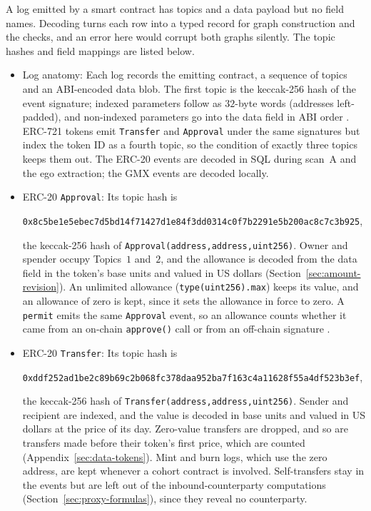 A log emitted by a smart contract has topics and a data payload but no field names. Decoding turns each row into a typed record for graph construction and the checks, and an error here would corrupt both graphs silently. The topic hashes and field mappings are listed below.

\begin{itemize}
\item Log anatomy: Each log records the emitting contract, a sequence of topics and an ABI-encoded data blob. The first topic is the keccak-256 hash of the event signature; indexed parameters follow as $32$-byte words (addresses left-padded), and non-indexed parameters go into the data field in ABI order \parencite{vogelsteller2015erc20}. ERC-721 tokens emit \texttt{Transfer} and \texttt{Approval} under the same signatures but index the token ID as a fourth topic, so the condition of exactly three topics keeps them out. The ERC-20 events are decoded in SQL during scan~A and the ego extraction; the GMX events are decoded locally.

\item ERC-20 \texttt{Approval}: Its topic hash is
\begin{center}
\texttt{0x8c5be1e5ebec7d5bd14f71427d1e84f3dd0314c0f7b2291e5b200ac8c7c3b925},
\end{center}
the keccak-256 hash of \texttt{Approval(address,address,uint256)}. Owner and spender occupy Topics~$1$ and~$2$, and the allowance is decoded from the data field in the token's base units and valued in US dollars (Section~\ref{sec:amount-revision}). An unlimited allowance (\texttt{type(uint256).max}) keeps its value, and an allowance of zero is kept, since it sets the allowance in force to zero. A \texttt{permit} emits the same \texttt{Approval} event, so an allowance counts whether it came from an on-chain \texttt{approve()} call or from an off-chain signature \parencite{lundfall2020permit}.

\item ERC-20 \texttt{Transfer}: Its topic hash is
\begin{center}
\texttt{0xddf252ad1be2c89b69c2b068fc378daa952ba7f163c4a11628f55a4df523b3ef},
\end{center}
the keccak-256 hash of \texttt{Transfer(address,address,uint256)}. Sender and recipient are indexed, and the value is decoded in base units and valued in US dollars at the price of its day. Zero-value transfers are dropped, and so are transfers made before their token's first price, which are counted (Appendix~\ref{sec:data-tokens}). Mint and burn logs, which use the zero address, are kept whenever a cohort contract is involved. Self-transfers stay in the events but are left out of the inbound-counterparty computations (Section~\ref{sec:proxy-formulas}), since they reveal no counterparty.


\end{itemize}
